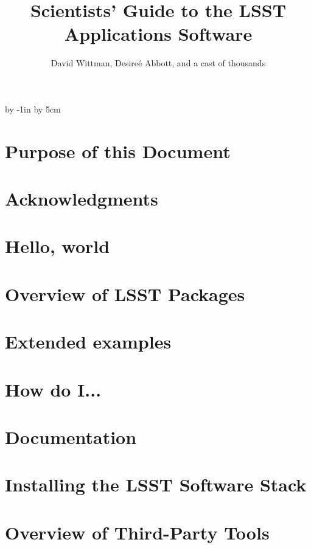 \documentclass{book}
\title{Scientists' Guide to the LSST Applications Software}
\author{David Wittman, Desire\'{e} Abbott, and a cast of thousands}
\begin{document}
\advance\hoffset by -1in
\advance\hsize by 5cm

\maketitle

\chapter*{Purpose of this Document\label{chap-purpose}}


\chapter*{Acknowledgments\label{chap-acknowledgements}}



\chapter{Hello, world\label{chap-hello}}


\chapter{Overview of LSST Packages\label{chap-overview}}



\chapter{Extended examples\label{chap-examples}}


\chapter{How do I...\label{chap-howto}}


\chapter{Documentation\label{chap-doc}}


%
% 



\appendix

\chapter{Installing the LSST Software Stack\label{appendix-stackinstall}}


\chapter{Overview of Third-Party Tools\label{appendix-thirdparty}}

\end{document}
